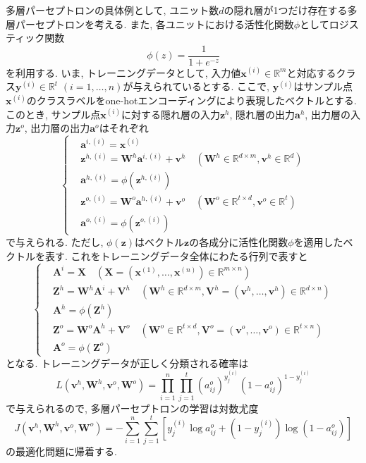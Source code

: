\documentclass[uplatex]{jsarticle}
\theoremstyle{definition}
\numberwithin{equation}{section}
\newcommand{\R}{\mathbb{R}}
\begin{document}
多層パーセプトロンの具体例として, ユニット数$d$の隠れ層が1つだけ存在する多層パーセプトロンを考える.
また, 各ユニットにおける活性化関数$\phi$としてロジスティック関数
\begin{equation}
    \phi(z) = \frac{1}{1 + e^{-z}}
\end{equation}
を利用する.
いま, トレーニングデータとして, 入力値$\bm{x}^{(i)} \in \R^{m}$と対応するクラス$\bm{y}^{(i)} \in \R^{t}$ $(i = 1, \dots, n)$が与えられているとする.
ここで, $\bm{y}^{(i)}$はサンプル点$\bm{x}^{(i)}$のクラスラベルをone-hotエンコーディングにより表現したベクトルとする.
このとき, サンプル点$\bm{x}^{(i)}$に対する隠れ層の入力$\bm{z}^{h}$, 隠れ層の出力$\bm{a}^{h}$, 出力層の入力$\bm{z}^{o}$, 出力層の出力$\bm{a}^{o}$はそれぞれ
\begin{equation}
    \left\{
    \begin{aligned}
        &\bm{a}^{i, (i)} = \bm{x}^{(i)} \\
        &\bm{z}^{h, (i)} = \bm{W}^{h}\bm{a}^{i, (i)} + \bm{v}^{h} \quad (\bm{W}^{h} \in \R^{d \times m}, \bm{v}^{h} \in \R^{d}) \\
        &\bm{a}^{h, (i)} = \phi(\bm{z}^{h, (i)}) \\
        &\bm{z}^{o, (i)} = \bm{W}^{o}\bm{a}^{h, (i)} + \bm{v}^{o} \quad (\bm{W}^{o} \in \R^{t \times d}, \bm{v}^{o} \in \R^{t}) \\
        &\bm{a}^{o, (i)} = \phi(\bm{z}^{o, (i)})
    \end{aligned}
    \right.
\end{equation}
で与えられる.
ただし, $\phi(\bm{z})$はベクトル$\bm{z}$の各成分に活性化関数$\phi$を適用したベクトルを表す.
これをトレーニングデータ全体にわたる行列で表すと
\begin{equation}
    \left\{
    \begin{aligned}
        &\bm{A}^{i} = \bm{X} \quad (\bm{X} = (\bm{x}^{(1)}, \dots, \bm{x}^{(n)}) \in \R^{m \times n}) \\
        &\bm{Z}^{h} = \bm{W}^{h}\bm{A}^{i} + \bm{V}^{h} \quad (\bm{W}^{h} \in \R^{d \times m}, \bm{V}^{h} = (\bm{v}^{h}, \dots, \bm{v}^{h}) \in \R^{d \times n}) \\
        &\bm{A}^{h} = \phi(\bm{Z}^{h}) \\
        &\bm{Z}^{o} = \bm{W}^{o}\bm{A}^{h} + \bm{V}^{o} \quad (\bm{W}^{o} \in \R^{t \times d}, \bm{V}^{o} = (\bm{v}^{o}, \dots, \bm{v}^{o}) \in \R^{t \times n}) \\
        &\bm{A}^{o} = \phi(\bm{Z}^{o})
    \end{aligned}
    \right.
\end{equation}
となる.
トレーニングデータが正しく分類される確率は
\begin{equation}
    L(\bm{v}^{h}, \bm{W}^{h}, \bm{v}^{o}, \bm{W}^{o}) = \prod_{i = 1}^{n} \prod_{j = 1}^{t} (a^{o}_{ij})^{y^{(i)}_{j}}(1 - a^{o}_{ij})^{1 - y^{(i)}_{j}}
\end{equation}
で与えられるので, 多層パーセプトロンの学習は対数尤度
\begin{equation}
    J(\bm{v}^{h}, \bm{W}^{h}, \bm{v}^{o}, \bm{W}^{o}) = -\sum_{i = 1}^{n}\sum_{j = 1}^{t} [y^{(i)}_{j}\log{a^{o}_{ij}} + (1 - y^{(i)}_{j})\log(1 - a^{o}_{ij})]
\end{equation}
の最適化問題に帰着する.
\end{document}
